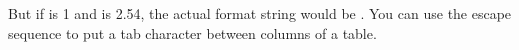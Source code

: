 But if  is 1 and  is 2.54, the actual format string would be .
You can use the escape sequence  to put a tab character between columns of a table.
